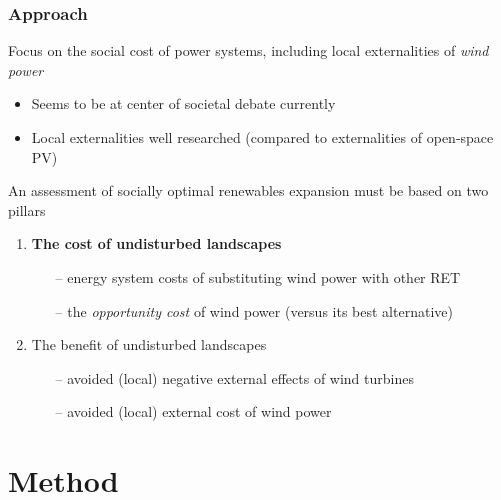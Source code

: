 \documentclass[aspectratio=1610, xcolor=dvipsnames,handout]{beamer} %
\begin{document}
    \begin{frame}
        \frametitle{Approach}
        Focus on the social cost of power systems, including local externalities of \emph{wind power}
        \begin{itemize}
            \item Seems to be at center of societal debate currently
            \item Local externalities well researched (compared to externalities of open-space PV)
        \end{itemize}
        \medskip
        An assessment of socially optimal renewables expansion must be based on two pillars
        \begin{enumerate}
            \item \textbf{\textcolor{bokugreen}{The cost of undisturbed landscapes}}
            \begin{itemize}
                \item[--] energy system costs of substituting wind power with other RET
                \item[--] the \emph{opportunity cost} of wind power (versus its best alternative)
            \end{itemize}
            \item \textcolor{bokugreen}{The benefit of undisturbed landscapes}
            \begin{itemize}
                \item[--] avoided (local) negative external effects of wind turbines
                \item[--] avoided (local) external cost of wind power
            \end{itemize}
        \end{enumerate}
    \end{frame}


    \section{Method}\label{sec:method}
\end{document}
